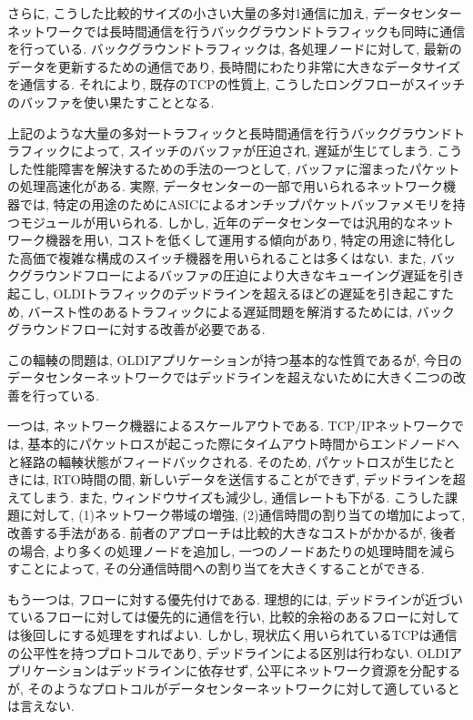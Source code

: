 さらに, こうした比較的サイズの小さい大量の多対1通信に加え,
データセンターネットワークでは長時間通信を行うバックグラウンドトラフィックも同時に通信を行っている. 
バックグラウンドトラフィックは, 各処理ノードに対して, 最新のデータを更新するための通信であり, 長時間にわたり非常に大きなデータサイズを通信する. 
それにより, 既存のTCPの性質上, こうしたロングフローがスイッチのバッファを使い果たすこととなる. 

上記のような大量の多対一トラフィックと長時間通信を行うバックグラウンドトラフィックによって, スイッチのバッファが圧迫され, 遅延が生じてしまう. 
こうした性能障害を解決するための手法の一つとして, バッファに溜まったパケットの処理高速化がある. 
実際, データセンターの一部で用いられるネットワーク機器では, 特定の用途のためにASICによるオンチップパケットバッファメモリを持つモジュールが用いられる. 
しかし, 近年のデータセンターでは汎用的なネットワーク機器を用い, コストを低くして運用する傾向があり,
特定の用途に特化した高価で複雑な構成のスイッチ機器を用いられることは多くはない.\cite{memory} 
また, バックグラウンドフローによるバッファの圧迫により大きなキューイング遅延を引き起こし,
OLDIトラフィックのデッドラインを超えるほどの遅延を引き起こすため, 
バースト性のあるトラフィックによる遅延問題を解消するためには, バックグラウンドフローに対する改善が必要である\cite{dctcp}. 

この輻輳の問題は, OLDIアプリケーションが持つ基本的な性質であるが,
今日のデータセンターネットワークではデッドラインを超えないために大きく二つの改善を行っている. 

一つは, ネットワーク機器によるスケールアウトである. 
TCP/IPネットワークでは, 基本的にパケットロスが起こった際にタイムアウト時間からエンドノードへと経路の輻輳状態がフィードバックされる. 
そのため, パケットロスが生じたときには, RTO時間の間, 新しいデータを送信することができず, デッドラインを超えてしまう. 
また, ウィンドウサイズも減少し, 通信レートも下がる. 
こうした課題に対して, (1)ネットワーク帯域の増強, (2)通信時間の割り当ての増加によって, 改善する手法がある. 
前者のアプローチは比較的大きなコストがかかるが, 後者の場合, より多くの処理ノードを追加し, 一つのノードあたりの処理時間を減らすことによって,
その分通信時間への割り当てを大きくすることができる. 

もう一つは, フローに対する優先付けである. 
理想的には, デッドラインが近づいているフローに対しては優先的に通信を行い, 比較的余裕のあるフローに対しては後回しにする処理をすればよい. 
しかし, 現状広く用いられているTCPは通信の公平性を持つプロトコルであり, デッドラインによる区別は行わない. 
OLDIアプリケーションはデッドラインに依存せず, 公平にネットワーク資源を分配するが,
そのようなプロトコルがデータセンターネットワークに対して適しているとは言えない\cite{d3}. 


